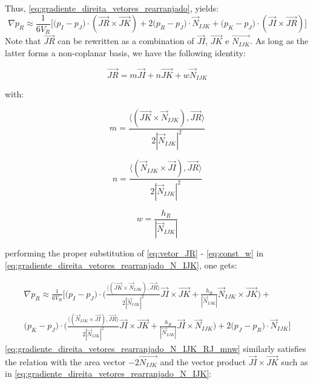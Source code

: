\documentclass{article}
\begin{document}
Thus, \ref{eq:gradiente_direita_vetores_rearranjado}, yields: 
\begin{equation} \label{eq:gradiente_direita_vetores_rearranjado_N_IJK}
\nabla p_{R} \approx \frac{1}{6V_{R}}\bigg[ \big( p_{I} - p_{J}\big) \cdot (\vec{JR} \times \vec{JK}) + 
2\big(p_{R} - p_{J}\big) \cdot \vec{N}_{IJK} +
\big( p_{K} - p_{J} \big) \cdot (\vec{JI} \times \vec{JR}) \bigg]
\end{equation}
Note that $\vec{JR}$ can be rewritten as a combination of $\vec{JI}$, $\vec{JK}$ e $\vec{N_{IJK}}$. As long as the latter forms a non-coplanar basis, we have the following identity:

\begin{equation} \label{eq:vetor_JR}
\vec{JR} = m\vec{JI} + n\vec{JK} + w\vec{N}_{IJK}
\end{equation}

with:

\begin{equation} \label{eq:const_m}
m = \frac{\langle(\vec{JK} \times \vec{N}_{IJK}), \vec{JR}\rangle}{2 |\vec{N}_{IJK}|^2} 
\end{equation}

\begin{equation} \label{eq:const_n}
n = \frac{\langle(\vec{N}_{IJK} \times \vec{JI}), \vec{JR}\rangle}{2 |\vec{N}_{IJK}|^2}
\end{equation}

\begin{equation} \label{eq:const_w}
w = \frac{h_{R}}{|\vec{N}_{IJK}|}
\end{equation}

performing the proper substitution of \ref{eq:vetor_JR} - \ref{eq:const_w} in \ref{eq:gradiente_direita_vetores_rearranjado_N_IJK}, one gets:

\begin{equation} \label{eq:gradiente_direita_vetores_rearranjado_N_IJK_RJ_mnw}
\begin{split}
\nabla p_{R} \approx \frac{1}{6V_{R}} \Bigg[ \big( p_{I} - p_{J}\big) \cdot  \Bigg( \frac{\langle(\vec{JK} \times \vec{N}_{IJK}), \vec{JR}\rangle}{2 |\vec{N}_{IJK}|^2}\vec{JI} \times \vec{JK}+ \frac{h_{R}}{|\vec{N}_{IJK}|}\vec{N}_{IJK}\times \vec{JK}\Bigg)+ \\
\big( p_{K} - p_{J} \big) \cdot \Bigg(\frac{\langle(\vec{N}_{IJK} \times \vec{JI}), \vec{JR}\rangle}{2 |\vec{N}_{IJK}|^2} \vec{JI} \times \vec{JK} +  \frac{h_{R}}{|\vec{N}_{IJK}|}\vec{JI} \times \vec{N}_{IJK}\Bigg) + 2 \big(p_{J} - p_{R}\big) \cdot \vec{N}_{IJK} \Bigg]
\end{split}
\end{equation}
 \ref{eq:gradiente_direita_vetores_rearranjado_N_IJK_RJ_mnw} similarly satisfies the relation with the area vector $-2\vec{N_{IJK}}$ and the vector product $\vec{JI} \times \vec{JK}$ such as in \ref{eq:gradiente_direita_vetores_rearranjado_N_IJK}:
\end{document}
